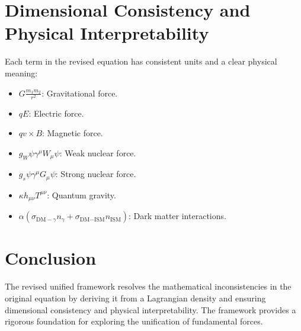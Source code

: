 \documentclass{article}
\begin{document}
\section{Dimensional Consistency and Physical Interpretability}
Each term in the revised equation has consistent units and a clear physical meaning:
\begin{itemize}
    \item \( G\frac{m_1 m_2}{r^2} \): Gravitational force.
    \item \( qE \): Electric force.
    \item \( qv \times B \): Magnetic force.
    \item \( g_W \psi \gamma^\mu W_\mu \psi \): Weak nuclear force.
    \item \( g_s \psi \gamma^\mu G_\mu \psi \): Strong nuclear force.
    \item \( \kappa h_{\mu\nu} T^{\mu\nu} \): Quantum gravity.
    \item \( \alpha \left( \sigma_{\text{DM}-\gamma} n_{\gamma} + \sigma_{\text{DM}-\text{ISM}} n_{\text{ISM}} \right) \): Dark matter interactions.
\end{itemize}

\section{Conclusion}
The revised unified framework resolves the mathematical inconsistencies in the original equation by deriving it from a Lagrangian density and ensuring dimensional consistency and physical interpretability. The framework provides a rigorous foundation for exploring the unification of fundamental forces.



\end{document}
